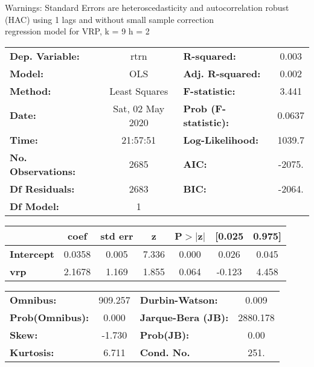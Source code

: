 Warnings: \newline
 [1] Standard Errors are heteroscedasticity and autocorrelation robust (HAC) using 1 lags and without small sample correction\\ 

regression model for VRP, k = 9 h = 2\begin{center}
\begin{tabular}{lclc}
\toprule
\textbf{Dep. Variable:}    &       rtrn       & \textbf{  R-squared:         } &     0.003   \\
\textbf{Model:}            &       OLS        & \textbf{  Adj. R-squared:    } &     0.002   \\
\textbf{Method:}           &  Least Squares   & \textbf{  F-statistic:       } &     3.441   \\
\textbf{Date:}             & Sat, 02 May 2020 & \textbf{  Prob (F-statistic):} &   0.0637    \\
\textbf{Time:}             &     21:57:51     & \textbf{  Log-Likelihood:    } &    1039.7   \\
\textbf{No. Observations:} &        2685      & \textbf{  AIC:               } &    -2075.   \\
\textbf{Df Residuals:}     &        2683      & \textbf{  BIC:               } &    -2064.   \\
\textbf{Df Model:}         &           1      & \textbf{                     } &             \\
\bottomrule
\end{tabular}
\begin{tabular}{lcccccc}
                   & \textbf{coef} & \textbf{std err} & \textbf{z} & \textbf{P$> |$z$|$} & \textbf{[0.025} & \textbf{0.975]}  \\
\midrule
\textbf{Intercept} &       0.0358  &        0.005     &     7.336  &         0.000        &        0.026    &        0.045     \\
\textbf{vrp}       &       2.1678  &        1.169     &     1.855  &         0.064        &       -0.123    &        4.458     \\
\bottomrule
\end{tabular}
\begin{tabular}{lclc}
\textbf{Omnibus:}       & 909.257 & \textbf{  Durbin-Watson:     } &    0.009  \\
\textbf{Prob(Omnibus):} &   0.000 & \textbf{  Jarque-Bera (JB):  } & 2880.178  \\
\textbf{Skew:}          &  -1.730 & \textbf{  Prob(JB):          } &     0.00  \\
\textbf{Kurtosis:}      &   6.711 & \textbf{  Cond. No.          } &     251.  \\
\bottomrule
\end{tabular}
\end{center}

